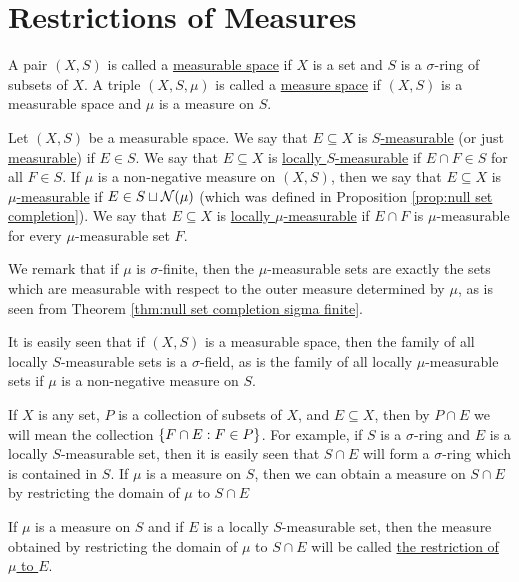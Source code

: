 
\section{Restrictions of Measures}

\begin{definition}
A pair $(X,S)$ is called a \underline{measurable space} if $X$ is a set and $S$ is a $\sigma$-ring of subsets of $X$. A triple $(X,S,\mu)$ is called a \underline{measure space} if $(X,S)$ is a measurable space and $\mu$ is a measure on $S$.
\end{definition}

\begin{definition}
\label{def:measure space set locally}
Let $(X, S)$ be a measurable space. We say that $E \subseteq X$ is \underline{$S$-measurable} (or just \underline{measurable}) if $E \in S$. We say that $E \subseteq X$ is \underline{locally $S$-measurable} if $E\cap F\in S$ for all $F \in S$. If $\mu$ is a non-negative measure on $(X, S)$, then we say that $E \subseteq X$ is \underline{$\mu$-measurable} if $E \in S\sqcup{\cal N}(\mu)$ (which was defined in Proposition \ref{prop:null set completion}). We say that $E\subseteq X$ is \underline{locally $\mu$-measurable} if $E\cap F$ is $\mu$-measurable for every $\mu$-measurable set $F$.
\end{definition}

We remark that if $\mu$ is $\sigma$-finite, then the $\mu$-measurable sets are exactly the sets which are measurable with respect to the outer measure determined by $\mu$, as is seen from Theorem \ref{thm:null set completion sigma finite}.

It is easily seen that if $(X, S)$ is a measurable space, then the family of all locally $S$-measurable sets is a $\sigma$-field, as is the family of all locally $\mu$-measurable sets if $\mu$ is a non-negative measure on $S$.

If $X$ is any set, $P$ is a collection of subsets of $X$, and $E \subseteq X$, then by $P \cap E$ we will mean the collection $\left\{F \cap E:F\in P\right\}$. For example, if $S$ is a $\sigma$-ring and $E$ is a locally $S$-measurable set, then it is easily seen that $S \cap E$ will form a $\sigma$-ring which is contained in $S$. If $\mu$ is a measure on $S$, then we can obtain a measure on $S \cap E$ by restricting the domain of $\mu$ to $S \cap E$

\begin{definition}
If $\mu$ is a measure on $S$ and if $E$ is a locally $S$-measurable set, then the measure obtained by restricting the domain of $\mu$ to $S \cap E$ will be called \underline{the restriction of $\mu$ to $E$}.
\end{definition}

